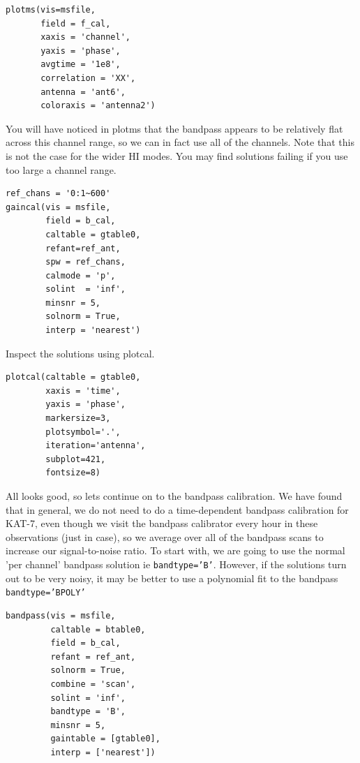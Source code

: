 \documentclass[force,almostfull,justified]{tufte-book}
\begin{document}
\begin{casacmd}
\begin{verbatim}
plotms(vis=msfile,
       field = f_cal,
       xaxis = 'channel',
       yaxis = 'phase',
       avgtime = '1e8',
       correlation = 'XX',
       antenna = 'ant6',
       coloraxis = 'antenna2')
\end{verbatim}
\end{casacmd}

You will have noticed in plotms that the bandpass appears to be
relatively flat across this channel range, so we can in fact use all of
the channels.  Note that this is not the case for the wider HI modes.
You may find solutions failing if you use too large a channel range.

\begin{casacmd}
\begin{verbatim}
ref_chans = '0:1~600'
gaincal(vis = msfile,
        field = b_cal,
        caltable = gtable0,
        refant=ref_ant,
        spw = ref_chans,
        calmode = 'p',
        solint  = 'inf',
        minsnr = 5,
        solnorm = True,
        interp = 'nearest')
\end{verbatim}
\end{casacmd}

Inspect the solutions using plotcal.

\begin{casacmd}
\begin{verbatim}
plotcal(caltable = gtable0,
        xaxis = 'time',
        yaxis = 'phase',
        markersize=3,
        plotsymbol='.',
        iteration='antenna',
        subplot=421,
        fontsize=8)
\end{verbatim}
\end{casacmd}

All looks good, so lets continue on to the bandpass calibration. We have
found that in general, we do not need to do a time-dependent bandpass
calibration for KAT-7, even though we visit the bandpass calibrator
every hour in these observations (just in case), so we average over all
of the bandpass scans to increase our signal-to-noise ratio.  To start
with, we are going to use the normal 'per channel' bandpass solution ie
{\tt bandtype='B'}. However, if the solutions turn out to be very noisy,
it may be better to use a polynomial fit to the bandpass {\tt
bandtype='BPOLY'}

\begin{casacmd}
\begin{verbatim}
bandpass(vis = msfile,
         caltable = btable0,
         field = b_cal,
         refant = ref_ant, 
         solnorm = True,
         combine = 'scan',
         solint = 'inf', 
         bandtype = 'B',
         minsnr = 5,
         gaintable = [gtable0],
         interp = ['nearest'])
\end{verbatim}
\end{casacmd}
\end{document}
